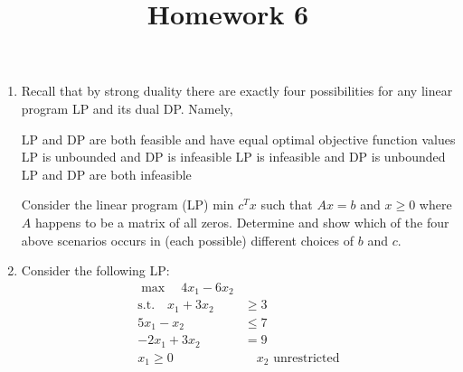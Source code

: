 \documentclass{article}
\begin{document}
\title{Homework 6}
\maketitle
\thispagestyle{fancy}

\begin{enumerate}
	\item Recall that by strong duality there are exactly four possibilities for any linear program LP and its dual DP. Namely,
		\begin{enumerate}[i)]
				\ii LP and DP are both feasible and have equal optimal objective function values
				\ii LP is unbounded and DP is infeasible
				\ii LP is infeasible and DP is unbounded
				\ii LP and DP are both infeasible
		\end{enumerate}

		Consider the linear program (LP) min $c^T x$ such that $Ax=b$ and $x\ge 0$ where $A$ happens to be a matrix of all zeros. Determine and show which of the four above scenarios occurs in (each possible) different choices of $b$ and $c.$

	\item Consider the following LP:
		\begin{align*}
			\max \quad 4x_1-6x_2 & \\
			\text{s.t.}\quad x_1+3x_2 &\ge 3 \\
			5x_1-x_2 &\le 7 \\
			-2x_1+3x_2 &= 9 \\
			x_1\ge 0 &\quad x_2\text{ unrestricted}
		\end{align*}


\end{enumerate}
\end{document}
